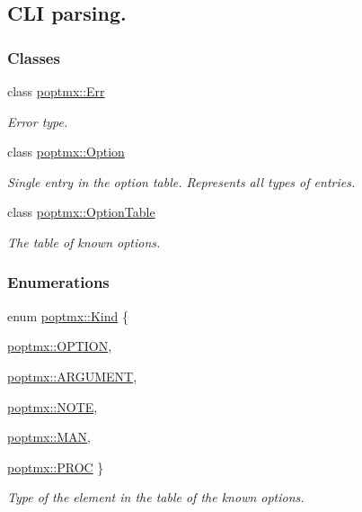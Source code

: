 \hypertarget{group__poptmx}{
\subsection{CLI parsing.}
\label{group__poptmx}
}
\subsubsection*{Classes}
\begin{DoxyCompactItemize}
\item 
class \hyperlink{classpoptmx_1_1Err}{poptmx::Err}
\begin{DoxyCompactList}\small\item\em Error type. \item\end{DoxyCompactList}\item 
class \hyperlink{classpoptmx_1_1Option}{poptmx::Option}
\begin{DoxyCompactList}\small\item\em Single entry in the option table. Represents all types of entries. \item\end{DoxyCompactList}\item 
class \hyperlink{classpoptmx_1_1OptionTable}{poptmx::OptionTable}
\begin{DoxyCompactList}\small\item\em The table of known options. \item\end{DoxyCompactList}\end{DoxyCompactItemize}
\subsubsection*{Enumerations}
\begin{DoxyCompactItemize}
\item 
enum \hyperlink{group__poptmx_ga3f58821f631b466567d001183ca437e2}{poptmx::Kind} \{ \par
\hyperlink{group__poptmx_gga3f58821f631b466567d001183ca437e2affc5b1466e5baa32ed759fa555b93166}{poptmx::OPTION}, 
\par
\hyperlink{group__poptmx_gga3f58821f631b466567d001183ca437e2ae6b944d205068c8e07dd858a29d7a10c}{poptmx::ARGUMENT}, 
\par
\hyperlink{group__poptmx_gga3f58821f631b466567d001183ca437e2a79795e03cf07b845739edbd17b593efd}{poptmx::NOTE}, 
\par
\hyperlink{group__poptmx_gga3f58821f631b466567d001183ca437e2a760f082107b9c9bcc3be220a447d2695}{poptmx::MAN}, 
\par
\hyperlink{group__poptmx_gga3f58821f631b466567d001183ca437e2a7c6de12b5b9dd5b71e9ed8ecb54a0cdd}{poptmx::PROC}
 \}
\begin{DoxyCompactList}\small\item\em Type of the element in the table of the known options. \item\end{DoxyCompactList}\end{DoxyCompactItemize}
